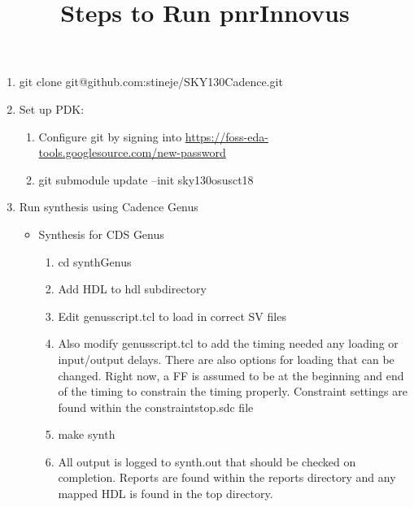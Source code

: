 \documentclass{article}
\title{Steps to Run pnrInnovus}
\author{}
\date{}
\begin{document}
\maketitle
\vspace{-2cm}

\begin{enumerate}
    \item git clone git@github.com:stineje/SKY130\textunderscore Cadence.git
    \item Set up PDK: 
    \begin{enumerate}
        \item Configure git by signing into \url{https://foss-eda-tools.googlesource.com/new-password}
        \item  git submodule update --init sky130\textunderscore osu\textunderscore sc\textunderscore t18
    \end{enumerate}
   \item Run synthesis using Cadence Genus 
   \begin{itemize}
         \item Synthesis for CDS Genus
            \begin{enumerate}
            \item cd synthGenus
            \item Add HDL to hdl subdirectory
            \item Edit genus\textunderscore script.tcl to load in correct SV files
            \item  Also modify genus\textunderscore script.tcl to add the timing needed any loading or input/output delays. There are also options for loading that can be changed. Right now, a FF is assumed to be at the beginning and end of the timing to constrain the timing properly. Constraint settings are found within the constraints\textunderscore top.sdc file
            \item make synth
            \item All output is logged to synth.out that should be checked on completion. Reports are found within the reports directory and any mapped HDL is found in the top directory.
        \end{enumerate}
 

\end{itemize}
\end{enumerate}
\end{document}
